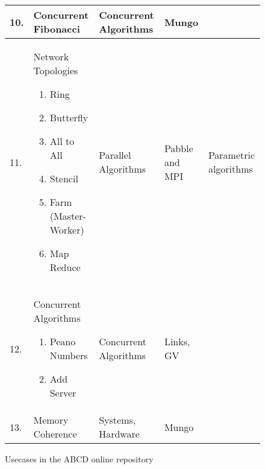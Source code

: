 \begin{figure}
\begin{longtable}{|  l | p{3.2cm} | p{3cm} | p{2.5cm} | p{2.7cm} | }
		\hline
		10.	&	Concurrent Fibonacci
						&	Concurrent Algorithms		&	Mungo					&
		\\
		\hline
		11.	&	Network Topologies
				\begin{enumerate}[label=$\bullet$]
					\item	Ring
					\item	Butterfly
					\item	All to All
					\item	Stencil
					\item	Farm (Master-Worker)
					\item	Map Reduce
				\end{enumerate}
						&	Parallel Algorithms		&	Pabble and MPI				&	Parametric algorithms
		\\
		\hline
		12.	&	Concurrent Algorithms
				\begin{enumerate}[label=$\bullet$]
					\item	Peano Numbers
					\item	Add Server
				\end{enumerate}
						&	Concurrent Algorithms	&	Links, GV					&
		\\
		\hline
		13.	&	Memory Coherence
						&	Systems, Hardware		&	Mungo						&	
		\\
		\hline
	\end{longtable}
	\caption{Usecases in the ABCD online repository}
\end{figure}

